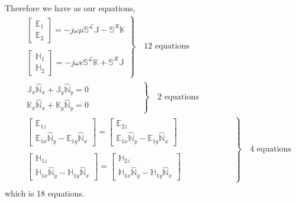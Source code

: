 \documentclass{article}
\renewcommand{\L}{\mathbf{\mathcal{L}}}
\newcommand{\R}{\mathbf{\mathcal{R}}}
\newcommand{\0}{\varnothing}
\newcommand{\Ev}{\mathbb{E}}
\newcommand{\Jv}{\mathbb{J}}
\newcommand{\Hv}{\mathbb{H}}
\newcommand{\Kv}{\mathbb{K}}
\newcommand{\SLm}{\mathbb{S}^\L}
\newcommand{\SRm}{\mathbb{S}^\R}
\newcommand{\N}{\mathbb{\hat N}}
\begin{document}
Therefore we have as our equations,
\begin{align*}
&\left.
    \begin{array}{c}
    \left[\begin{array}{c}\Ev_1\\\Ev_2\end{array}\right]
    = -j\omega\mu \SLm \Jv - \SRm \Kv\\\\
    \left[\begin{array}{c}\Hv_1\\\Hv_2\end{array}\right]
     = -j\omega\epsilon \SLm \Kv + \SRm \Jv
    \end{array}\right\} \quad \text{12 equations}\\
     &\left.
    \begin{array}{c}
    \Jv_x \N_x + \Jv_y \N_y  = 0 \\
    \Kv_x \N_x + \Kv_y \N_y = 0 
    \end{array}\quad \quad \quad \quad \quad \quad \right\} \quad \text{2 equations}\\
    & \left.
     \begin{array}{c}
    \left[
    \begin{array}{c}
	    \Ev_{1z} \\
	    \Ev_{1x} \N_y - \Ev_{1y} \N_x
	\end{array}
	\right] = 
	   \left[
    \begin{array}{c}
	    \Ev_{2z} \\
	    \Ev_{1x} \N_y - \Ev_{1y} \N_x
	\end{array}	\right]	\\\\
	\left[
    \begin{array}{c}
	    \Hv_{1z} \\
	    \Hv_{1x} \N_y - \Hv_{1y} \N_x
	\end{array}
	\right] = 
	   \left[
    \begin{array}{c}
	    \Hv_{2z} \\
	    \Hv_{1x} \N_y - \Hv_{1y} \N_x
	\end{array}	\right]	
	\end{array}
	\quad \quad \quad \quad \quad \quad \right\} \quad \text{4 equations}\\
\end{align*}
which is 18 equations.
\end{document}
